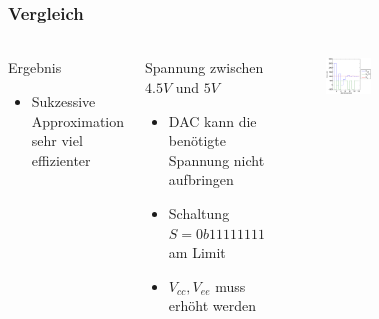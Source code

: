\begin{frame}
    \frametitle{Vergleich}
    \framesubtitle{}
    \begin{columns}[c]
            \begin{block}{Ergebnis}
                \begin{itemize}
                    \item Sukzessive Approximation sehr viel effizienter
                \end{itemize}
            \end{block}
            \begin{block}{Spannung zwischen $4.5V$ und $5V$}
                 \begin{itemize}
                     \item DAC kann die benötigte Spannung nicht aufbringen
                     \item Schaltung $S=0b11111111$ am Limit
                     \item $V_{cc},V_{ee}$ muss erhöht werden
                 \end{itemize}
            \end{block}
            \begin{figure}[H]
            \begin{center}
                    \includegraphics[scale=0.25]{./img/graph/Aufgabe2a2.eps}
            \end{center}
            \end{figure}
            \begin{figure}[H]

\end{figure}
\end{columns}
\end{frame}
